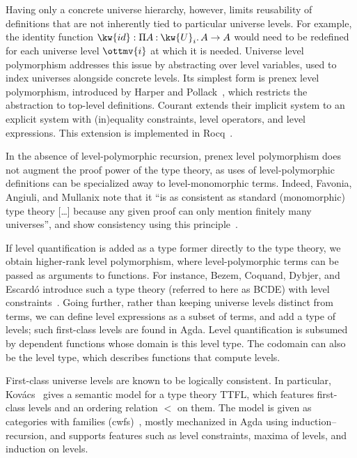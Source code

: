 \documentclass[a4paper,UKenglish,cleveref,autoref,thm-restate]{lipics-v2021}
\newcommand{\citep}[1]{\cite{#1}}
\begin{document}
Having only a concrete universe hierarchy, however,
limits reusability of definitions that are not inherently tied to particular universe levels.
For example, the identity function $\kw{id} :   \Pi  A  \mathbin{:}   \kw{U}_{ i }   \mathpunct{.}  A   \to  A $
would need to be redefined for each universe level $\ottmv{i}$ at which it is needed.
Universe level polymorphism addresses this issue by abstracting over level variables,
used to index universes alongside concrete levels.
Its simplest form is prenex level polymorphism,
introduced by Harper and Pollack~\citep{anon-univ},
which restricts the abstraction to top-level definitions.
Courant extends their implicit system to an explicit system
with (in)equality constraints, level operators, and level expressions.
This extension is implemented in Rocq~\citep{univ-poly-coq}.

In the absence of level-polymorphic recursion,
prenex level polymorphism does not augment the proof power of the type theory,
as uses of level-polymorphic definitions
can be specialized away to level-monomorphic terms.
Indeed, Favonia, Angiuli, and Mullanix note that it
``is as consistent as standard (monomorphic) type theory [\dots]
because any given proof can only mention finitely many universes'',
and show consistency using this principle~\citep{displacement}.

If level quantification is added as a type former directly to the type theory,
we obtain higher-rank level polymorphism,
where level-polymorphic terms can be passed as arguments to functions.
For instance, Bezem, Coquand, Dybjer, and Escard\'o
introduce such a type theory (referred to here as BCDE)
with level constraints~\citep{univ-poly}.
Going further, rather than keeping universe levels distinct from terms,
we can define level expressions as a subset of terms,
and add a type of levels;
such first-class levels are found in Agda.
Level quantification is subsumed by dependent functions whose domain is this level type.
The codomain can also be the level type,
which describes functions that compute levels.

First-class universe levels are known to be logically consistent.
In particular, Kov\'{a}cs~\citep{gen-univ} gives a semantic model for a type theory TTFL,
which features first-class levels and an ordering relation $<$ on them.
The model is given as categories with families (cwfs)~\citep{cwf},
mostly mechanized in Agda using induction--recursion,
and supports features such as level constraints,
maxima of levels, and induction on levels.
\end{document}
